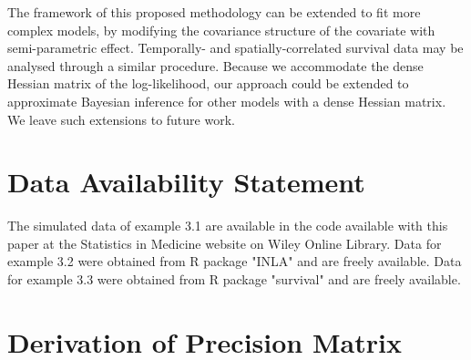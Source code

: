 \documentclass[ba]{imsart}
\begin{document}
The framework of this proposed methodology can be extended to fit more complex models, by modifying the covariance structure of the covariate with semi-parametric effect. Temporally- and spatially-correlated survival data may be analysed through a similar procedure. Because we accommodate the dense Hessian matrix of the log-likelihood, our approach could be extended to approximate Bayesian inference for other models with a dense Hessian matrix. We leave such extensions to future work.

\section*{Data Availability Statement}
The simulated data of example 3.1 are available in the code available with this paper at the Statistics in Medicine website on Wiley Online Library.
Data for example 3.2 were obtained from R package "INLA" \citep{inla} and are freely available.
Data for example 3.3 were obtained from R package "survival" \citep{survival-package} and are freely available. 

\appendix

\section{Derivation of Precision Matrix}
\end{document}
